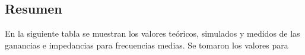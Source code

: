 \subsection{Resumen}

En la siguiente tabla se muestran los valores teóricos, simulados y medidos de las ganancias e impedancias para frecuencias medias. Se tomaron los valores para %


